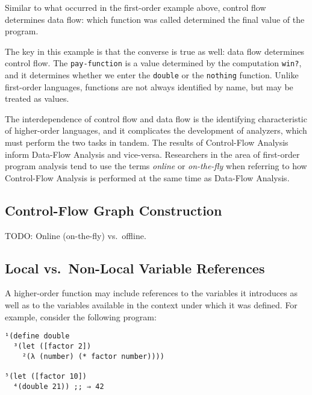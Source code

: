 \documentclass[12pt, oneside]{book}
\begin{document}
Similar to what occurred in the first-order example above, control flow determines data flow: which function was called determined the final value of the program.

The key in this example is that the converse is true as well: data flow determines control flow. The \texttt{pay-function} is a value determined by the computation \texttt{win?}, and it determines whether we enter the \texttt{double} or the \texttt{nothing} function. Unlike first-order languages, functions are not always identified by name, but may be treated as values.

The interdependence of control flow and data flow is the identifying characteristic of higher-order languages, and it complicates the development of analyzers, which must perform the two tasks in tandem. The results of Control-Flow Analysis inform Data-Flow Analysis and vice-versa. Researchers in the area of first-order program analysis tend to use the terms \emph{online} or \emph{on-the-fly} when referring to how Control-Flow Analysis is performed at the same time as Data-Flow Analysis.

\subsection{Control-Flow Graph Construction}

TODO: Online (on-the-fly) vs.\ offline.

\subsection{Local vs.\ Non-Local Variable References}

A higher-order function may include references to the variables it introduces as well as to the variables available in the context under which it was defined. For example, consider the following program:

\begin{Verbatim}
¹(define double
  ³(let ([factor 2])
    ²(λ (number) (* factor number))))

⁵(let ([factor 10])
  ⁴(double 21)) ;; ⇒ 42
\end{Verbatim}
\end{document}
